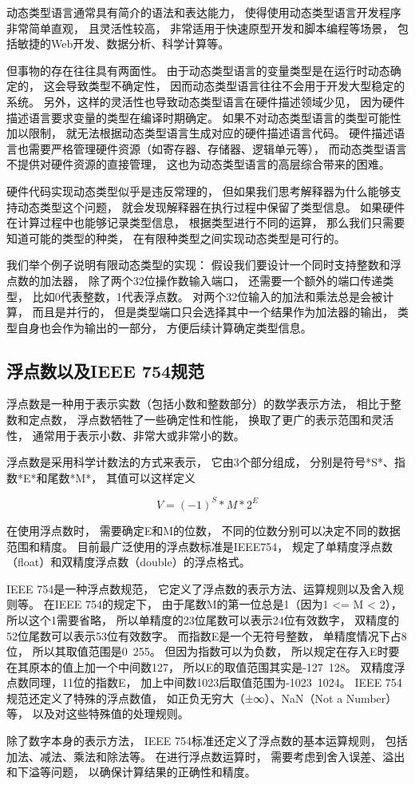 动态类型语言通常具有简介的语法和表达能力，
使得使用动态类型语言开发程序非常简单直观，
且灵活性较高，
非常适用于快速原型开发和脚本编程等场景，
包括敏捷的Web开发、数据分析、科学计算等。

但事物的存在往往具有两面性。
由于动态类型语言的变量类型是在运行时动态确定的，
这会导致类型不确定性，
因而动态类型语言往往不会用于开发大型稳定的系统。
另外，这样的灵活性也导致动态类型语言在硬件描述领域少见，
因为硬件描述语言要求变量的类型在编译时期确定。
如果不对动态类型语言的类型可能性加以限制，
就无法根据动态类型语言生成对应的硬件描述语言代码。
硬件描述语言也需要严格管理硬件资源（如寄存器、存储器、逻辑单元等），
而动态类型语言不提供对硬件资源的直接管理，
这也为动态类型语言的高层综合带来的困难。

硬件代码实现动态类型似乎是违反常理的，
但如果我们思考解释器为什么能够支持动态类型这个问题，
就会发现解释器在执行过程中保留了类型信息。
如果硬件在计算过程中也能够记录类型信息，
根据类型进行不同的运算，
那么我们只需要知道可能的类型的种类，
在有限种类型之间实现动态类型是可行的。

我们举个例子说明有限动态类型的实现：
假设我们要设计一个同时支持整数和浮点数的加法器，
除了两个32位操作数输入端口，
还需要一个额外的端口传递类型，
比如0代表整数，1代表浮点数。
对两个32位输入的加法和乘法总是会被计算，
而且是并行的，
但是类型端口只会选择其中一个结果作为加法器的输出，
类型自身也会作为输出的一部分，
方便后续计算确定类型信息。

\subsection{浮点数以及IEEE 754规范}

浮点数是一种用于表示实数（包括小数和整数部分）的数学表示方法，
相比于整数和定点数，
浮点数牺牲了一些确定性和性能，
换取了更广的表示范围和灵活性，
通常用于表示小数、非常大或非常小的数。

浮点数是采用科学计数法的方式来表示，
它由3个部分组成，
分别是符号*S*、指数*E*和尾数*M*，
其值可以这样定义

$$V =  (-1)^S * M * 2^E$$

在使用浮点数时，
需要确定E和M的位数，
不同的位数分别可以决定不同的数据范围和精度。
目前最广泛使用的浮点数标准是IEEE754，
规定了单精度浮点数（float）和双精度浮点数（double）的浮点格式。

IEEE 754是一种浮点数规范，
它定义了浮点数的表示方法、运算规则以及舍入规则等。
在IEEE 754的规定下，
由于尾数M的第一位总是1（因为1 <= M < 2），
所以这个1需要省略，
所以单精度的23位尾数可以表示24位有效数字，
双精度的52位尾数可以表示53位有效数字。
而指数E是一个无符号整数，
单精度情况下占8位，
所以其取值范围是0~255。
但因为指数可以为负数，
所以规定在存入E时要在其原本的值上加一个中间数127，
所以E的取值范围其实是-127~128。
双精度浮点数同理，11位的指数E，
加上中间数1023后取值范围为-1023~1024。
IEEE 754规范还定义了特殊的浮点数值，
如正负无穷大（±∞）、NaN（Not a Number）等，
以及对这些特殊值的处理规则。

除了数字本身的表示方法，
IEEE 754标准还定义了浮点数的基本运算规则，
包括加法、减法、乘法和除法等。
在进行浮点数运算时，
需要考虑到舍入误差、溢出和下溢等问题，
以确保计算结果的正确性和精度。